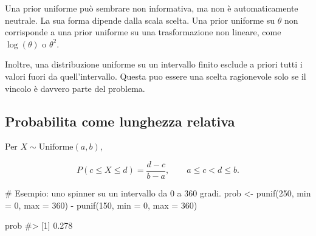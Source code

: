 \documentclass[
  italian,
  letterpaper,
  a4paper,
  11pt,
  open=any]{scrbook}
\newenvironment{Shaded}{\begin{snugshade}}{\end{snugshade}}
\newcommand{\AttributeTok}[1]{\textcolor[rgb]{0.40,0.45,0.13}{#1}}
\newcommand{\CommentTok}[1]{\textcolor[rgb]{0.37,0.37,0.37}{#1}}
\newcommand{\DecValTok}[1]{\textcolor[rgb]{0.68,0.00,0.00}{#1}}
\newcommand{\FunctionTok}[1]{\textcolor[rgb]{0.28,0.35,0.67}{#1}}
\newcommand{\NormalTok}[1]{\textcolor[rgb]{0.00,0.23,0.31}{#1}}
\newcommand{\OtherTok}[1]{\textcolor[rgb]{0.00,0.23,0.31}{#1}}
\newcommand{\SpecialCharTok}[1]{\textcolor[rgb]{0.37,0.37,0.37}{#1}}
\theoremstyle{plain}
\theoremstyle{definition}
\theoremstyle{definition}
\theoremstyle{remark}
\begin{document}
\begin{tcolorbox}[enhanced jigsaw, arc=.35mm, bottomrule=.15mm, bottomtitle=1mm, breakable, colback=white, colbacktitle=quarto-callout-warning-color!10!white, colframe=quarto-callout-warning-color-frame, coltitle=black, left=2mm, leftrule=.75mm, opacityback=0, opacitybacktitle=0.6, rightrule=.15mm, title=\textcolor{quarto-callout-warning-color}{\faExclamationTriangle}\hspace{0.5em}{La prior uniforme non e sempre neutrale}, titlerule=0mm, toprule=.15mm, toptitle=1mm]

Una prior uniforme può sembrare non informativa, ma non è
automaticamente neutrale. La sua forma dipende dalla scala scelta. Una
prior uniforme su \(\theta\) non corrisponde a una prior uniforme su una
trasformazione non lineare, come \(\log(\theta)\) o \(\theta^2\).

Inoltre, una distribuzione uniforme su un intervallo finito esclude a
priori tutti i valori fuori da quell'intervallo. Questa puo essere una
scelta ragionevole solo se il vincolo è davvero parte del problema.

\end{tcolorbox}

\subsection{Probabilita come lunghezza
relativa}\label{probabilita-come-lunghezza-relativa}

Per \(X \sim \mathrm{Uniforme}(a,b)\),

\[
P(c \leq X \leq d) = \frac{d-c}{b-a},
\qquad a \leq c < d \leq b.
\]

\begin{Shaded}
\begin{Highlighting}[]
\CommentTok{\# Esempio: uno spinner su un intervallo da 0 a 360 gradi.}
\NormalTok{prob }\OtherTok{\textless{}{-}} \FunctionTok{punif}\NormalTok{(}\DecValTok{250}\NormalTok{, }\AttributeTok{min =} \DecValTok{0}\NormalTok{, }\AttributeTok{max =} \DecValTok{360}\NormalTok{) }\SpecialCharTok{{-}}
  \FunctionTok{punif}\NormalTok{(}\DecValTok{150}\NormalTok{, }\AttributeTok{min =} \DecValTok{0}\NormalTok{, }\AttributeTok{max =} \DecValTok{360}\NormalTok{)}

\NormalTok{prob}
\CommentTok{\#\textgreater{} [1] 0.278}
\end{Highlighting}
\end{Shaded}
\end{document}
